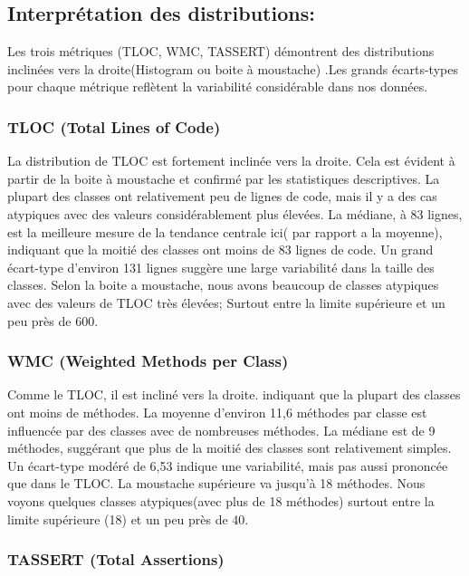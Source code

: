 \documentclass[10pt]{article}
\begin{document}
\subsection*{Interprétation des distributions:}

Les trois métriques (TLOC, WMC, TASSERT) démontrent des distributions inclinées vers la droite(Histogram ou boite à moustache) .Les grands écarts-types pour chaque métrique reflètent la variabilité considérable dans nos données.

\subsubsection{TLOC (Total Lines of Code)}

La distribution de TLOC est fortement inclinée vers la droite. Cela est évident à partir de la boite à moustache et confirmé par les statistiques descriptives. La plupart des classes ont relativement peu de lignes de code, mais il y a des cas atypiques avec des valeurs considérablement plus élevées. La médiane, à 83 lignes, est la meilleure mesure de la tendance centrale ici( par rapport a la moyenne), indiquant que la moitié des classes ont moins de 83 lignes de code. Un grand écart-type d'environ 131 lignes suggère une large variabilité dans la taille des classes. Selon la boite a moustache, nous avons beaucoup de classes atypiques avec des valeurs de TLOC très élevées; Surtout entre la limite supérieure et un peu près de 600.

\subsubsection{WMC (Weighted Methods per Class)}

Comme le TLOC, il est incliné vers la droite.  indiquant que la plupart des classes ont moins de méthodes. La moyenne d'environ 11,6 méthodes par classe est influencée par des classes avec de nombreuses méthodes. La médiane est de 9 méthodes, suggérant que plus de la moitié des classes sont relativement simples. Un écart-type modéré de 6,53 indique une variabilité, mais pas aussi prononcée que dans le TLOC. La moustache supérieure va jusqu'à 18 méthodes. Nous voyons quelques classes atypiques(avec plus de 18 méthodes) surtout entre la limite supérieure (18) et un peu près de 40.

\subsubsection{TASSERT (Total Assertions)}
\end{document}
